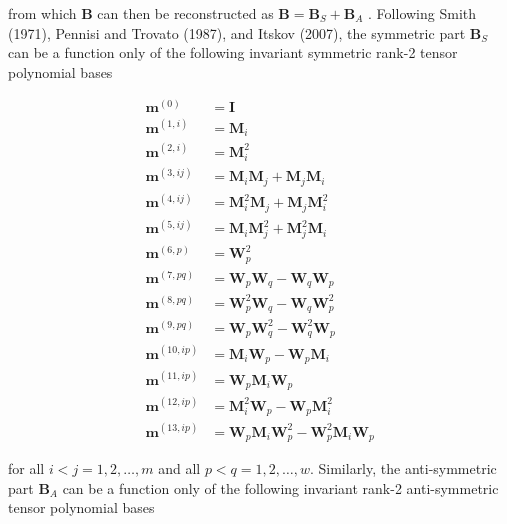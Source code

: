 from which $\mathbf{B}$ can then be reconstructed as $ \mathbf{B}= \mathbf{B}_S + \mathbf{B}_A$ . Following Smith (1971), Pennisi and Trovato (1987), and Itskov (2007), the symmetric part  $\mathbf{B}_S$ can be a function only of the following invariant symmetric rank-2 tensor polynomial bases

%
\begin{subequations}
\begin{align}
	\label{E:28}
		\mathbf{m}^{(0)} &= \mathbf{I}  \\
		\mathbf{m}^{(1,i)} &= \mathbf{M}_i \\ 
		\mathbf{m}^{(2,i)} &= \mathbf{M}^2_i \\ 
		\mathbf{m}^{(3,ij)} &= \mathbf{M}_i \mathbf{M}_j + \mathbf{M}_j \mathbf{M}_i \\ 
		\mathbf{m}^{(4,ij)} &= \mathbf{M}^2_i \mathbf{M}_j + \mathbf{M}_j \mathbf{M}^2_i \\
		\mathbf{m}^{(5,ij)} &= \mathbf{M}_i \mathbf{M}^2_j + \mathbf{M}^2_j \mathbf{M}_i \\
		\mathbf{m}^{(6,p)} &= \mathbf{W}^2_p \\ 
		\mathbf{m}^{(7,pq)} &= \mathbf{W}_p \mathbf{W}_q - \mathbf{W}_q \mathbf{W}_p \\ 
		\mathbf{m}^{(8,pq)} &= \mathbf{W}^2_p \mathbf{W}_q - \mathbf{W}_q \mathbf{W}^2_p \\
		\mathbf{m}^{(9,pq)} &= \mathbf{W}_p \mathbf{W}^2_q - \mathbf{W}^2_q \mathbf{W}_p \\
		\mathbf{m}^{(10,ip)} &= \mathbf{M}_i \mathbf{W}_p - \mathbf{W}_p \mathbf{M}_i   \\
		\mathbf{m}^{(11,ip)} &= \mathbf{W}_p \mathbf{M}_i \mathbf{W}_p   \\ 
		\mathbf{m}^{(12,ip)} &= \mathbf{M}^2_i \mathbf{W}_p-\mathbf{W}_p \mathbf{M}^2_i\\ 
		\mathbf{m}^{(13,ip)} &= \mathbf{W}_p \mathbf{M}_i \mathbf{W}^2_p
							   -\mathbf{W}^2_p \mathbf{M}_i \mathbf{W}_p
\end{align}
\end{subequations}
%
%      
	 	
for all $i<j = 1,2,\ldots,m$  and all $p<q = 1,2,\ldots,w$.  Similarly, the anti-symmetric part  $\mathbf{B}_A$ can be a function only of the following invariant rank-2 anti-symmetric tensor polynomial bases


